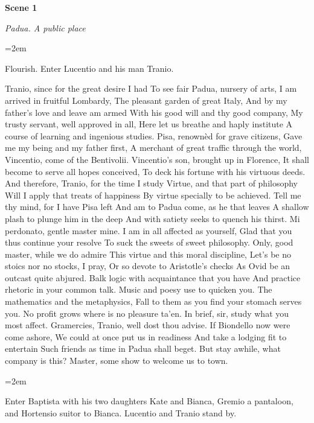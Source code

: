 \documentclass[11pt]{article}
\newcommand{\spk}[1]{\vspace{1mm}{\textbf{\scshape #1}}}
\newenvironment{vs}
  {\par\addvspace{5pt}\begingroup\parindent=0pt\parskip=0pt\obeylines}
  {\endgroup\par\addvspace{2pt}}
\newcommand{\sd}[1]{\par\addvspace{4pt}%
  {\leftskip=2em\itshape\raggedright #1\par}\addvspace{4pt}}
\newcommand{\scenehead}[2]{\par\addvspace{16pt}%
  {\centering\large\bfseries #1\par}\addvspace{2pt}%
  {\centering\itshape #2\par}\addvspace{8pt}}
\newcommand{\actpage}[1]{\clearpage
  \begin{center}\vspace*{1.4cm}{\fontsize{24}{28}\selectfont\scshape #1}\end{center}
  \vspace{0.5cm}}
\begin{document}
\actpage{Act I}

\scenehead{Scene 1}{Padua. A public place}
\sd{Flourish. Enter Lucentio and his man Tranio.}

\begin{vs}
\spk{Lucentio}
Tranio, since for the great desire I had
To see fair Padua, nursery of arts,
I am arrived in fruitful Lombardy,
The pleasant garden of great Italy,
And by my father's love and leave am armed
With his good will and thy good company,
My trusty servant, well approved in all,
Here let us breathe and haply institute
A course of learning and ingenious studies.
Pisa, renownèd for grave citizens,
Gave me my being and my father first,
A merchant of great traffic through the world,
Vincentio, come of the Bentivolii.
Vincentio's son, brought up in Florence,
It shall become to serve all hopes conceived,
To deck his fortune with his virtuous deeds.
And therefore, Tranio, for the time I study
Virtue, and that part of philosophy
Will I apply that treats of happiness
By virtue specially to be achieved.
Tell me thy mind, for I have Pisa left
And am to Padua come, as he that leaves
A shallow plash to plunge him in the deep
And with satiety seeks to quench his thirst.
\spk{Tranio}
Mi perdonato, gentle master mine.
I am in all affected as yourself,
Glad that you thus continue your resolve
To suck the sweets of sweet philosophy.
Only, good master, while we do admire
This virtue and this moral discipline,
Let's be no stoics nor no stocks, I pray,
Or so devote to Aristotle's checks
As Ovid be an outcast quite abjured.
Balk logic with acquaintance that you have
And practice rhetoric in your common talk.
Music and poesy use to quicken you.
The mathematics and the metaphysics,
Fall to them as you find your stomach serves you.
No profit grows where is no pleasure ta'en.
In brief, sir, study what you most affect.
\spk{Lucentio}
Gramercies, Tranio, well dost thou advise.
If Biondello now were come ashore,
We could at once put us in readiness
And take a lodging fit to entertain
Such friends as time in Padua shall beget.
But stay awhile, what company is this?
\spk{Tranio}
Master, some show to welcome us to town.
\end{vs}
\sd{Enter Baptista with his two daughters Kate and Bianca, Gremio a pantaloon, and Hortensio suitor to Bianca. Lucentio and Tranio stand by.}
\end{document}
